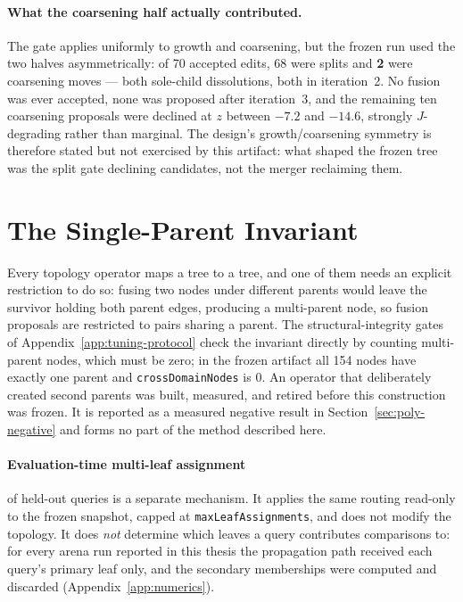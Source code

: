 \paragraph{What the coarsening half actually contributed.}
The gate applies uniformly to growth and coarsening, but the frozen run used the two
halves asymmetrically: of 70 accepted edits, 68 were splits and \textbf{2} were
coarsening moves --- both sole-child dissolutions, both in iteration~2. No fusion was
ever accepted, none was proposed after iteration~3, and the remaining ten coarsening
proposals were declined at $z$ between $-7.2$ and $-14.6$, strongly $J$-degrading rather
than marginal. The design's growth/coarsening symmetry is therefore stated but not
exercised by this artifact: what shaped the frozen tree was the split gate declining
candidates, not the merger reclaiming them.

\section{The Single-Parent Invariant}\label{app:cross-link-operator}

Every topology operator maps a tree to a tree, and one of them needs an explicit
restriction to do so: fusing two nodes under different parents would leave the survivor
holding both parent edges, producing a multi-parent node, so fusion proposals are
restricted to pairs sharing a parent.
The structural-integrity gates of Appendix~\ref{app:tuning-protocol} check the invariant
directly by counting multi-parent nodes, which must be zero; in the frozen artifact all
154 nodes have exactly one parent and \texttt{crossDomainNodes} is $0$.
An operator that deliberately created second parents was built, measured, and retired
before this construction was frozen. It is reported as a measured negative result in
Section~\ref{sec:poly-negative} and forms no part of the method described here.

\paragraph{Evaluation-time multi-leaf assignment} of held-out queries is a separate
mechanism. It applies the same routing read-only to the frozen snapshot, capped at
\texttt{maxLeafAssignments}, and does not modify the topology.
It does \emph{not} determine which leaves a query contributes comparisons to: for every
arena run reported in this thesis the propagation path received each query's primary leaf
only, and the secondary memberships were computed and discarded
(Appendix~\ref{app:numerics}).

